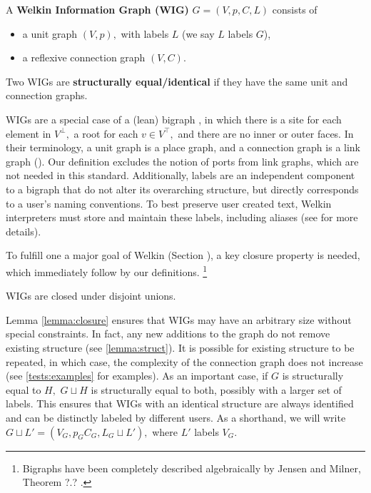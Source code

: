 \begin{definition} A \textbf{Welkin Information Graph (WIG)} $G = (V, p, C, L)$ consists of
  \begin{itemize}
    \item a unit graph $(V, p),$ with labels $L$ (we say $L$ labels $G$),
    \item a reflexive connection graph $(V, C).$
  \end{itemize}
  Two WIGs are \textbf{structurally equal/identical} if they have the same unit and connection graphs.
\end{definition}
\label{def:wig}

WIGs are a special case of a (lean) bigraph \cite{jensen-milner-bigraphs}, in which there is a site for each element in $V^{\bot},$ a root for each $v \in V^{\top},$ and there are no inner or outer faces. In their terminology, a unit graph is a place graph, and a connection graph is a link graph (\cite{jensen-milner-bigraphs}). Our definition excludes the notion of ports from link graphs, which are not needed in this standard. Additionally, labels are an independent component to a bigraph that do not alter its overarching structure, but directly corresponds to a user's naming conventions. To best preserve user created text, Welkin interpreters must store and maintain these labels, including aliases (see \label{req:labels} for more details).

To fulfill one a major goal of Welkin (Section \label{section:conformance}), a key closure property is needed, which immediately follow by our definitions. \footnote{Bigraphs have been completely described algebraically by Jensen and Milner, Theorem ?.? \cite{jensen-milner-bigraphs}. }

\begin{lemma}
  WIGs are closed under disjoint unions.
\end{lemma}
\label{lemma:closure}

Lemma \ref{lemma:closure} ensures that WIGs may have an arbitrary size without special constraints. In fact, any new additions to the graph do not remove existing structure (see \ref{lemma:struct}). It is possible for existing structure to be repeated, in which case, the complexity of the connection graph does not increase (see \ref{tests:examples} for examples). As an important case, if $G$ is structurally equal to $H,$ $G \sqcup H$ is structurally equal to both, possibly with a larger set of labels. This ensures that WIGs with an identical structure are always identified and can be distinctly labeled by different users. As a shorthand, we will write $G \sqcup L' = (V_{G}, p_{G} C_{G}, L_{G} \sqcup L'),$ where $L'$ labels $V_{G}.$

